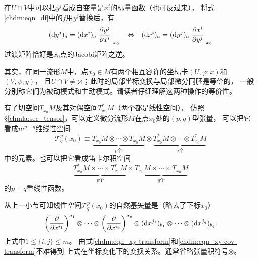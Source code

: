 
在$U\cap V$中可以把$y^j$看成自变量是$x^i$的标量函数（也可反过来），
将式\eqref{chdm:eqn_df}中的$f$用$y^j$替换后，有
\begin{equation}\label{chdm:eqn_xy-cov-transform}
    ({\rm d}y^j)_a = ({\rm d}x^i)_a \left.\frac{\partial y^j}{\partial x^i}\right|_{x_0} 
    {\quad \Leftrightarrow \quad }
    ({\rm d}x^i)_a = ({\rm d}y^j)_a \left.\frac{\partial x^i}{\partial y^j}\right|_{x_0} 
\end{equation}
过渡矩阵恰好是$x_0$点的Jacobi矩阵之逆。

其实，在同一流形$M$中，点$x_0\in M$有两个相互容许的坐标卡$(U,\varphi;x)$和$(V,\psi;y)$，
且$U\cap V \neq \varnothing$；此时的局部坐标变换与局部微分同胚是等价的，
一般分别称它们为被动模式和主动模式。请读者仔细理解这两种操作的等价性。

有了切空间$T_{x_0}M$及其对偶空间$T_{x_0}^{*}M$（两个都是线性空间），
仿照\S\ref{chmla:sec_tensor}，可以定义微分流形$M$在点$x_0$处的$({p},{q})$型张量，
可以把它看成$m^{p+q}$维线性空间
\begin{equation}\label{chdm:eqn_TM-TsM}
    \mathcal{T}^p_q(x_0) \equiv \underbrace{T_{x_0}M\otimes \cdots \otimes T_{x_0}M}_{p\text{个}}
    \otimes \underbrace{T_{x_0}^{*}M\otimes \cdots \otimes T_{x_0}^{*}M}_{q\text{个}}
\end{equation}
中的元素。也可以把它看成笛卡尔积空间
\begin{equation}\label{chdm:eqn_TM-X-TsM}
    \underbrace{T_{x_0}^{*}M \times \cdots \times T_{x_0}^{*}M}_{p\text{个}}
    \times \underbrace{T_{x_0}M\times \cdots \times T_{x_0}M}_{q\text{个}}
\end{equation}
的$p+q$重线性函数。


从上一小节可知线性空间$\mathcal{T}^p_q(x_0)$的自然基矢量是（略去了下标$x_0$）
\begin{equation}\label{chdm:eqn_tensortrans}
    \left(\frac{\partial }{\partial x^{i_1}}\right)^{a_1} \otimes \cdots \otimes
    \left(\frac{\partial }{\partial x^{i_p}}\right)^{a_p} \otimes
    ({\rm d}x^{j_1})_{b_1} \otimes \cdots \otimes ({\rm d}x^{j_q})_{b_q} .
\end{equation}
上式中$1\leqslant \{i,j\} \leqslant m $。
由式\eqref{chdm:eqn_xy-transform}和\eqref{chdm:eqn_xy-cov-transform}不难得到
上式在坐标变化下的变换关系。通常省略张量积符号$\otimes$。

